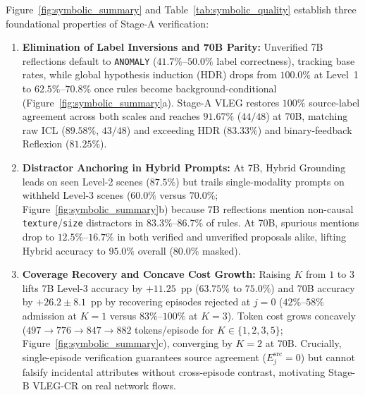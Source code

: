 \documentclass[11pt,letterpaper,onecolumn]{article}
\begin{document}
Figure~\ref{fig:symbolic_summary} and Table~\ref{tab:symbolic_quality} establish three foundational properties of Stage-A verification:
\begin{enumerate}[leftmargin=1.8em,topsep=2pt,itemsep=1.5pt]
    \item \textbf{Elimination of Label Inversions and 70B Parity:} Unverified 7B reflections default to \texttt{ANOMALY} ($41.7\%$--$50.0\%$ label correctness), tracking base rates, while global hypothesis induction (HDR) drops from $100.0\%$ at Level~1 to $62.5\%$--$70.8\%$ once rules become background-conditional (Figure~\ref{fig:symbolic_summary}a). Stage-A VLEG restores $100\%$ source-label agreement across both scales and reaches $91.67\%$ ($44/48$) at 70B, matching raw ICL ($89.58\%$, $43/48$) and exceeding HDR ($83.33\%$) and binary-feedback Reflexion ($81.25\%$).
    \item \textbf{Distractor Anchoring in Hybrid Prompts:} At 7B, Hybrid Grounding leads on seen Level-2 scenes ($87.5\%$) but trails single-modality prompts on withheld Level-3 scenes ($60.0\%$ versus $70.0\%$; Figure~\ref{fig:symbolic_summary}b) because 7B reflections mention non-causal \texttt{texture}/\texttt{size} distractors in $83.3\%$--$86.7\%$ of rules. At 70B, spurious mentions drop to $12.5\%$--$16.7\%$ in both verified and unverified proposals alike, lifting Hybrid accuracy to $95.0\%$ overall ($80.0\%$ masked).
    \item \textbf{Coverage Recovery and Concave Cost Growth:} Raising $K$ from $1$ to $3$ lifts 7B Level-3 accuracy by $+11.25$~pp ($63.75\%$ to $75.0\%$) and 70B accuracy by $+26.2 \pm 8.1$~pp by recovering episodes rejected at $j=0$ ($42\%$--$58\%$ admission at $K=1$ versus $83\%$--$100\%$ at $K=3$). Token cost grows concavely ($497 \to 776 \to 847 \to 882$ tokens/episode for $K \in \{1,2,3,5\}$; Figure~\ref{fig:symbolic_summary}c), converging by $K=2$ at 70B. Crucially, single-episode verification guarantees source agreement ($E_j^{\mathrm{src}}=0$) but cannot falsify incidental attributes without cross-episode contrast, motivating Stage-B VLEG-CR on real network flows.
\end{enumerate}
\end{document}
